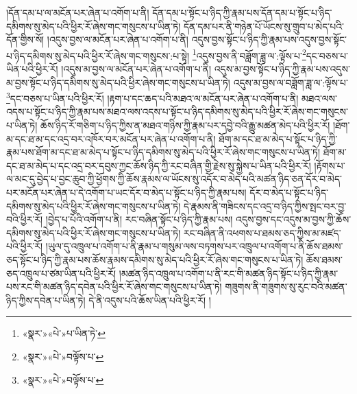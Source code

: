 །དོན་དམ་པ་ལ་མངོན་པར་ཞེན་པ་འགོག་པ་ནི། དོན་དམ་པ་སྟོང་པ་ཉིད་ཀྱི་རྣམ་པས་དོན་དམ་པ་སྟོང་པ་ཉིད་དམིགས་སུ་མེད་པའི་ཕྱིར་རོ་ཞེས་གང་གསུངས་པ་ཡིན་ཏེ། དོན་དམ་པར་ནི་གཉེན་པོ་ཡོངས་སུ་གྲུབ་པ་མེད་པའི་དོན་གྱིས་སོ། །འདུས་བྱས་ལ་མངོན་པར་ཞེན་པ་འགོག་པ་ནི། འདུས་བྱས་སྟོང་པ་ཉིད་ཀྱི་རྣམ་པས་འདུས་བྱས་སྟོང་པ་ཉིད་དམིགས་སུ་མེད་པའི་ཕྱིར་རོ་ཞེས་གང་གསུངས་:པ་སྟེ། \footnote{«སྣར་»«པེ་»པ་ཡིན་ཏེ་}འདུས་བྱས་ནི་བཟློག་ཟླ་ལ་:ལྟོས་པ་\footnote{«སྣར་»«པེ་»བལྟོས་པ་}དང་བཅས་པ་ཡིན་པའི་ཕྱིར་རོ། །འདུས་མ་བྱས་ལ་མངོན་པར་ཞེན་པ་འགོག་པ་ནི། འདུས་མ་བྱས་སྟོང་པ་ཉིད་ཀྱི་རྣམ་པས་འདུས་མ་བྱས་སྟོང་པ་ཉིད་དམིགས་སུ་མེད་པའི་ཕྱིར་ཞེས་གང་གསུངས་པ་ཡིན་ཏེ། འདུས་མ་བྱས་ལ་བཟློག་ཟླ་ལ་:ལྟོས་པ་\footnote{«སྣར་»«པེ་»བལྟོས་པ་}དང་བཅས་པ་ཡིན་པའི་ཕྱིར་རོ། །རྟག་པ་དང་ཆད་པའི་མཐའ་ལ་མངོན་པར་ཞེན་པ་འགོག་པ་ནི། མཐའ་ལས་འདས་པ་སྟོང་པ་ཉིད་ཀྱི་རྣམ་པས་མཐའ་ལས་འདས་པ་སྟོང་པ་ཉིད་དམིགས་སུ་མེད་པའི་ཕྱིར་རོ་ཞེས་གང་གསུངས་པ་ཡིན་ཏེ། ཆོས་ཉིད་རོ་གཅིག་པ་ཉིད་ཀྱིས་ན་མཐའ་གཉིས་ཀྱི་རྣམ་པར་དབྱེ་བའི་རྒྱུ་མཚན་མེད་པའི་ཕྱིར་རོ། །ཐོག་མ་དང་ཐ་མ་དང་འདྲ་བར་འཁོར་བར་མངོན་པར་ཞེན་པ་འགོག་པ་ནི། ཐོག་མ་དང་ཐ་མ་མེད་པ་སྟོང་པ་ཉིད་ཀྱི་རྣམ་པས་ཐོག་མ་དང་ཐ་མ་མེད་པ་སྟོང་པ་ཉིད་དམིགས་སུ་མེད་པའི་ཕྱིར་རོ་ཞེས་གང་གསུངས་པ་ཡིན་ཏེ། ཐོག་མ་དང་ཐ་མ་མེད་པ་དང་འདྲ་བར་དབུས་ཀྱང་ཆོས་ཉིད་ཀྱི་རང་བཞིན་གྱི་རྗེས་སུ་སྐྱེས་པ་ཡིན་པའི་ཕྱིར་རོ། །རྟོགས་པ་ལ་མང་དུ་བྱེད་པ་བྱང་ཆུབ་ཀྱི་ཕྱོགས་ཀྱི་ཆོས་རྣམས་ལ་ཡོངས་སུ་འདོར་བ་མེད་པའི་མཚན་ཉིད་ཅན་དོར་བ་མེད་པར་མངོན་པར་ཞེན་པ་དེ་འགོག་པ་ཡང་དོར་བ་མེད་པ་སྟོང་པ་ཉིད་ཀྱི་རྣམ་པས། དོར་བ་མེད་པ་སྟོང་པ་ཉིད་དམིགས་སུ་མེད་པའི་ཕྱིར་རོ་ཞེས་གང་གསུངས་པ་ཡིན་ཏེ། དེ་རྣམས་ནི་གཟིངས་དང་འདྲ་བ་ཉིད་ཀྱིས་སྤང་བར་བྱ་བའི་ཕྱིར་རོ། །བྱེད་པ་པོའི་འགོག་པ་ནི། རང་བཞིན་སྟོང་པ་ཉིད་ཀྱི་རྣམ་པས། འདུས་བྱས་དང་འདུས་མ་བྱས་ཀྱི་ཆོས་དམིགས་སུ་མེད་པའི་ཕྱིར་རོ་ཞེས་གང་གསུངས་པ་ཡིན་ཏེ། རང་བཞིན་ནི་འཕགས་པ་ཐམས་ཅད་ཀྱིས་མ་མཛད་པའི་ཕྱིར་རོ། །ཡུལ་དུ་འཁྲུལ་པ་འགོག་པ་ནི་རྣམ་པ་གསུམ་ལས་བཏགས་པར་འཁྲུལ་པ་འགོག་པ་ནི་ཆོས་ཐམས་ཅད་སྟོང་པ་ཉིད་ཀྱི་རྣམ་པས་ཆོས་རྣམས་དམིགས་སུ་མེད་པའི་ཕྱིར་རོ་ཞེས་གང་གསུངས་པ་ཡིན་ཏེ། ཆོས་ཐམས་ཅད་འཁྲུལ་པ་ཙམ་ཡིན་པའི་ཕྱིར་རོ། །མཚན་ཉིད་འཁྲུལ་པ་འགོག་པ་ནི་རང་གི་མཚན་ཉིད་སྟོང་པ་ཉིད་ཀྱི་རྣམ་པས་རང་གི་མཚན་ཉིད་དབེན་པའི་ཕྱིར་རོ་ཞེས་གང་གསུངས་པ་ཡིན་ཏེ། གཟུགས་ནི་གཟུགས་སུ་རུང་བའི་མཚན་ཉིད་ཀྱིས་དབེན་པ་ཡིན་ཏེ། དེ་ནི་འདུས་པའི་ཆོས་ཡིན་པའི་ཕྱིར་རོ། །
